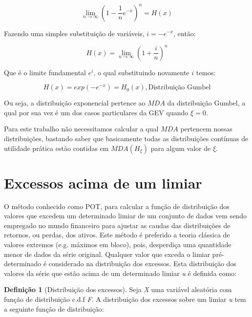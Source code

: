 \documentclass[review]{elsarticle}
\theoremstyle{definition}
\newtheorem{defi}[teor]{Definição}
\begin{document}
\begin{equation*}
\lim_{n \rightarrow \infty} \left(1-\frac{1}{n}e^{-x} \right)^n = H(x)
\end{equation*}

Fazendo uma simples substituição de variáveis, $i=-e^{-x}$, então:

\begin{equation*}
H(x)=\lim_{n \rightarrow \infty}\left(1+\frac{i}{n} \right)^n
\end{equation*}

Que é o limite fundamental $e^i$, o qual substituindo novamente $i$ temos:

\begin{equation*}
H(x)=exp\left(-e^{-x}\right)=H_0(x), \text{Distribuição Gumbel}
\end{equation*}

Ou seja, a distribuição exponencial pertence ao $MDA$ da distribuição Gumbel, a qual por sua vez é um dos casos particulares da GEV quando $\xi=0$.

Para este trabalho não necessitamos calcular a qual $MDA$ pertencem nossas distribuições, bastando saber que basicamente todas as distribuições contínuas de utilidade prática estão contidas em $MDA(H_\xi)$ para algum valor de $\xi$.

\section{Excessos acima de um limiar}
\label{sec:excess}

O método conhecido como POT, para calcular a função de distribuição dos valores que excedem um determinado limiar de um conjunto de dados vem sendo empregado no mundo financeiro para ajustar as caudas das distribuições de retornos, ou perdas, dos ativos. Este método é preferido a teoria clássica de valores extremos (e.g. máximos em bloco), pois, desperdiça uma quantidade menor de dados da série original. Qualquer valor que exceda o limiar pré-determinado é considerado na distribuição dos excessos. Esta distribuição dos valores da série que estão acima de um determinado limiar \emph{u} é definida como:

\begin{defi}[Distribuição dos excessos] \label{defi:excess}
	Seja \emph{X} uma variável aleatória com função de distribuição c.d.f \emph{F}. A distribuição dos excessos sobre um limiar \emph{u} tem a seguinte função de distribuição:
\end{defi}
\end{document}
